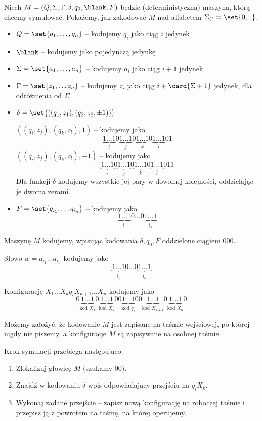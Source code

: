 Niech \( M = (Q, \Sigma, \Gamma, \delta, q_0, \blank, F) \) będzie (deterministyczną) maszyną, którą chcemy symulować. Pokażemy, jak zakodować \( M \) nad alfabetem \( \Sigma_U = \set{0, 1} \).
\begin{itemize}
    \item \( Q = \set{q_1, \dots, q_n} \) -- kodujemy \( q_i \) jako ciąg \( i \) jedynek
    \item \( \blank \) -- kodujemy jako pojedynczą jedynkę
    \item \( \Sigma = \set{a_1, \dots, a_n} \) -- kodujemy \( a_i \) jako ciąg \( i + 1 \) jedynek
    \item \( \Gamma = \set{z_1, \dots z_n} \) -- kodujemy \( z_i \) jako ciąg \( i + \card{\Sigma + 1} \) jedynek, dla odróżnienia od \( \Sigma \)
    \item \( \delta = \set{((q_1, z_1), (q_2, z_2, \pm 1))} \)
    
    \( ((q_i, z_j), (q_k, z_l), 1) \) -- kodujemy jako
    \[
        \underbrace{1 \dots 1}_i
        0
        \underbrace{1 \dots 1}_j
        0
        \underbrace{1 \dots 1}_k
        0
        \underbrace{1 \dots 1}_l
        0
        1
    \]
    \( ((q_i, z_j), (q_k, z_l), -1) \) -- kodujemy jako
    \[
        \underbrace{1 \dots 1}_i
        0
        \underbrace{1 \dots 1}_j
        0
        \underbrace{1 \dots 1}_k
        0
        \underbrace{1 \dots 1}_l
        0
        11
    \]
    Dla funkcji \(\delta\) kodujemy wszystkie jej pary w dowolnej kolejności, oddzielając je dwoma zerami.
    \item \( F = \set{q_{i_1}, \dots q_{i_n}} \) -- kodujemy jako
    \[
        \underbrace{1 \dots 1}_{i_1} 0 \dots 0 \underbrace{1 \dots 1}_{i_n}
    \]
\end{itemize}

Maszynę \( M \) kodujemy, wpisując kodowania \( \delta, q_0, F \) oddzielone ciągiem \( 000 \).

Słowo \( w = a_{i_1} \dots a_{i_n} \) kodujemy jako
\[
    \underbrace{1 \dots 1}_{i_1} 0 \dots 0 \underbrace{1 \dots 1}_{i_n}
\]

Konfigurację \( X_1 \dots X_k q_i X_{k+1} \dots X_n \) kodujemy jako
\[
    0\underbrace{1 \dots 1}_{\text{kod } X_1} 0 \underbrace{1 \dots 1}_{\text{kod } X_k} 00 \underbrace{1 \dots 1}_{\text{kod } q_i} 00 \underbrace{1 \dots 1}_{\text{kod } X_{k + 1}} 0 \underbrace{1 \dots 1}_{\text{kod } X_n} 0
\]

Możemy założyć, że kodowanie \( M \) jest zapisane na taśmie wejściowej, po której nigdy nie piszemy, a konfiguracje \( M \) są zapisywane na osobnej taśmie.

Krok symulacji przebiega następująco:
\begin{enumerate}
    \item Zlokalizuj głowicę \( M \) (szukamy \( 00 \)).
    \item Znajdź w kodowaniu \( \delta \) wpis odpowiadający przejściu na \( q_i X_k \).
    \item Wykonaj zadane przejście -- zapisz nową konfigurację na roboczej taśmie i przepisz ją z powrotem na taśmę, na której operujemy.
\end{enumerate}